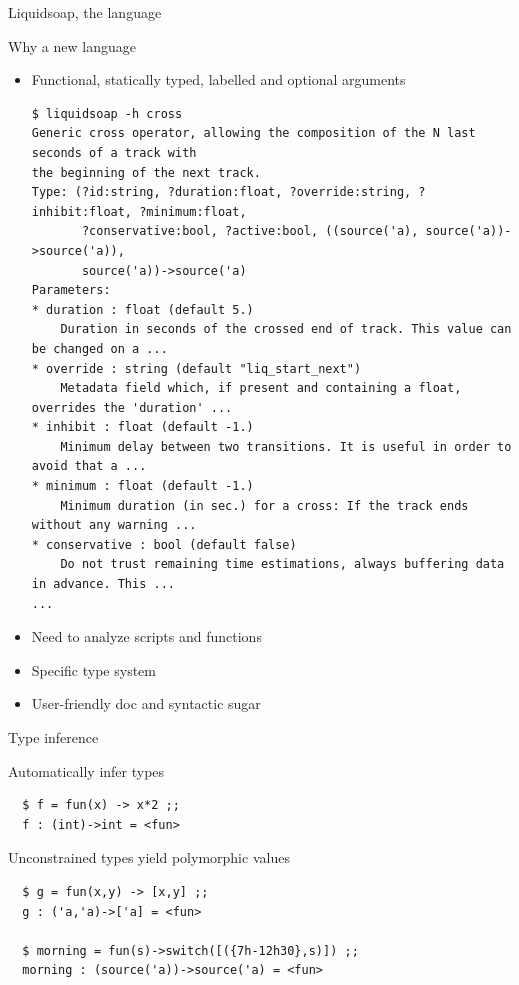 \documentclass{beamer}
\renewcommand{\emph}[1]{\alert{#1}}
\begin{document}
\begin{frame}[fragile]{Liquidsoap, the language}

  \begin{block}{Why a new language}
  \begin{itemize}
    \item Functional, statically typed, labelled and optional arguments
\begin{center}\tiny\begin{verbatim}
$ liquidsoap -h cross
Generic cross operator, allowing the composition of the N last seconds of a track with
the beginning of the next track.
Type: (?id:string, ?duration:float, ?override:string, ?inhibit:float, ?minimum:float,
       ?conservative:bool, ?active:bool, ((source('a), source('a))->source('a)),
       source('a))->source('a)
Parameters:
* duration : float (default 5.)
    Duration in seconds of the crossed end of track. This value can be changed on a ...
* override : string (default "liq_start_next")
    Metadata field which, if present and containing a float, overrides the 'duration' ...
* inhibit : float (default -1.)
    Minimum delay between two transitions. It is useful in order to avoid that a ...
* minimum : float (default -1.)
    Minimum duration (in sec.) for a cross: If the track ends without any warning ...
* conservative : bool (default false)
    Do not trust remaining time estimations, always buffering data in advance. This ...
...
\end{verbatim}\end{center}
    \item Need to analyze scripts and functions
    \item Specific type system
    \item User-friendly doc and syntactic sugar
  \end{itemize}
  \end{block}

\end{frame}

\begin{frame}[fragile]{Type inference}

\emph{Automatically} infer types
\begin{verbatim}
  $ f = fun(x) -> x*2 ;;
  f : (int)->int = <fun>
\end{verbatim}

\vfill

Unconstrained types yield \emph{polymorphic} values
\begin{verbatim}
  $ g = fun(x,y) -> [x,y] ;;
  g : ('a,'a)->['a] = <fun>

  $ morning = fun(s)->switch([({7h-12h30},s)]) ;;
  morning : (source('a))->source('a) = <fun>
\end{verbatim}

\end{frame}
\end{document}
